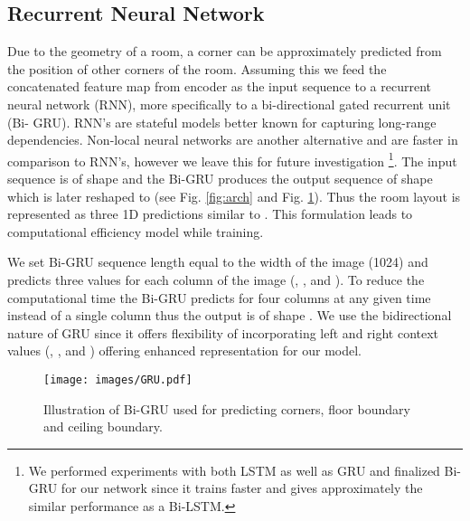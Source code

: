 \documentclass[final]{cvpr}
\begin{document}
\subsection{Recurrent Neural Network}\label{subsec:rnn}

Due to the geometry of a room, a corner can be approximately predicted from the position of other corners of the room. Assuming this we feed the concatenated feature map from encoder as the input sequence to a recurrent neural network (RNN), more specifically to a bi-directional gated recurrent unit (Bi- GRU). RNN's are stateful models better known for capturing long-range dependencies. Non-local neural networks \cite{rao2019non,wang2018non} are another alternative and are faster in comparison to RNN's, however we leave this for future investigation \footnote{We performed experiments with both LSTM \cite{hochreiter1997long} as well as GRU \cite{chung2014empirical} and finalized Bi-GRU for our network since it trains faster and gives approximately the similar performance as a Bi-LSTM.}. The input sequence is of shape  and the Bi-GRU produces the output sequence of shape  which is later reshaped to  (see Fig. \ref{fig:arch} and Fig. \ref{fig:gru}). Thus the room layout is represented as three 1D predictions similar to \cite{sun2019horizonnet}. This formulation leads to computational efficiency model while training.


We set Bi-GRU sequence length equal to the width of the image (1024) and predicts three values for each column of the image (, , and ). To reduce the computational time the Bi-GRU predicts for four columns at any given time instead of a single column thus the output is of shape . We use the bidirectional nature of GRU since it offers flexibility of incorporating left and right context values (, , and ) offering enhanced representation for our model.



\begin{figure}[!t]
    \centering
    \texttt{[image: images/GRU.pdf]}
    \caption{Illustration of Bi-GRU used for predicting corners, floor boundary and ceiling boundary.}
    \label{fig:gru}
\end{figure}
\end{document}
